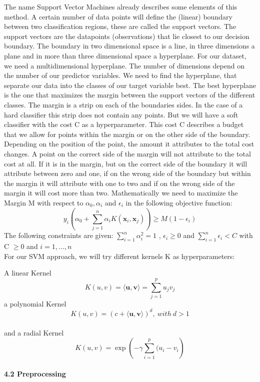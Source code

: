 \documentclass[
]{article}
\begin{document}
The name Support Vector Machines already describes some elements of this
method. A certain number of data points will define the (linear)
boundary between two classification regions, these are called the
support vectors. The support vectors are the datapoints (observations)
that lie closest to our decision boundary. The boundary in two
dimensional space is a line, in three dimensions a plane and in more
than three dimensional space a hyperplane. For our dataset, we need a
multidimensional hyperplane. The number of dimensions depend on the
number of our predictor variables. We need to find the hyperplane, that
separate our data into the classes of our target variable best. The best
hyperplane is the one that maximizes the margin between the support
vectors of the different classes. The margin is a strip on each of the
boundaries sides. In the case of a hard classifier this strip does not
contain any points. But we will have a soft classifier with the cost C
as a hyperparameter. This cost C describes a budget that we allow for
points within the margin or on the other side of the boundary. Depending
on the position of the point, the amount it attributes to the total cost
changes. A point on the correct side of the margin will not attribute to
the total cost at all. If it is in the margin, but on the correct side
of the boundary it will attribute between zero and one, if on the wrong
side of the boundary but within the margin it will attribute with one to
two and if on the wrong side of the margin it will cost more than two.
Mathematically we need to maximize the Margin M with respect to
\(\alpha_{0}, \alpha_{i}\) and \(\epsilon_{i}\) in the following
objective function:
\[y_{i}\left(\alpha_{0}+\sum_{j=1}^{n} \alpha_{i} K(\mathbf x_{i}, \mathbf x_{j})\right ) \ge M(1-\epsilon_{i})\]
The following constraints are given: \(\sum_{i=1}^{n} \alpha_{i}^{2}=1\)
, \(\epsilon_{i} \ge 0\) and \(\sum_{i=1}^{n} \epsilon_{i} < C\) with C
\(\ge 0\) and \(i=1,...,n\)\\

For our SVM approach, we will try different kernels K as
hyperparameters:

\hfill\break
A linear Kernel
\[ K(u,v) = \langle \mathbf u, \mathbf v \rangle = \sum_{j=1}^{p}u_{j}v_{j}\]
a polynomial Kernel
\[ K(u,v) = (c + \langle \mathbf u, \mathbf v \rangle)^{d}, \ with \ d > 1\]\\
and a radial Kernel
\[ K(u,v)= \exp \left(-\gamma \sum_{i=1}^{p}(u_{i}-v_{i} \right)\]

\hypertarget{preprocessing}{%
\paragraph{4.2 Preprocessing}\label{preprocessing}}
\end{document}
